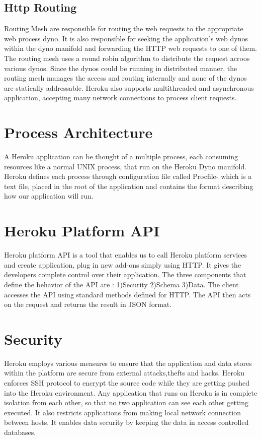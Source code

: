 \documentclass[9pt,twocolumn,twoside]{../../styles/osajnl}
\begin{document}
\subsection{Http Routing}
	Routing Mesh are responsible for routing the web requests to the appropriate
	web process dyno. It is also responsible for seeking the application’s web dynos
	within the dyno manifold and forwarding the HTTP web requests to one of them.
	The routing mesh uses a round robin algorithm to distribute the request acroos
	various dynos. Since the dynos could be running in distributed manner, the
	routing mesh manages the access and routing internally and none of the dynos are
	statically addressable. Heroku also supports multithreaded and asynchronous
	application, accepting many network connections to process client requests.


\section{Process Architecture}
	A Heroku application can be thought of a multiple process, each consuming
	resources like a normal UNIX process, that run on the Heroku Dyno manifold.
	Heroku defines each process through configuration file called Procfile- which is
	a text file, placed in the root of the application and contains the format
	describing 	how our application will run.

\section{Heroku Platform API}
	Heroku platform API \GE is a tool that enables us to call Heroku platform services
	and create application, plug in new add-ons simply using HTTP. It gives the
	developers complete control over their application. The three components that
	define the behavior of the API are : 1)Security 2)Schema 3)Data. The client
	accesses the API using standard methods defined for HTTP. The API then acts on
	the request and returns the result in JSON format.

\section{Security}
	Heroku employs various measures to ensure that the application and data stores
	within the platform are secure from external attacks,thefts and hacks. Heroku
	enforces SSH\cite{SSH} protocol to encrypt the source code while they are
	getting pushed into the Heroku environment. Any application that runs on Heroku
	is in complete isolation from each other, \GE so that no two application can see
	each other getting executed. It also restricts applications from making local
	network connection between hosts. It enables data security by keeping the data
	in access controlled databases.
\end{document}
